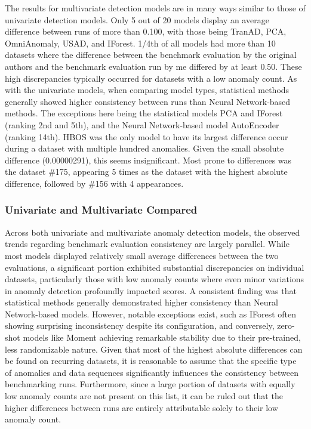 \documentclass[12pt,oneside]{article}
\begin{document}
The results for multivariate detection models are in many ways similar to those of univariate detection models. Only 5 out of 20 models display an average difference between runs of more than 0.100, with those being TranAD, PCA, OmniAnomaly, USAD, and IForest. 1/4th of all models had more than 10 datasets where the difference between the benchmark evaluation by the original authors and the benchmark evaluation run by me differed by at least 0.50. These high discrepancies typically occurred for datasets with a low anomaly count. As with the univariate models, when comparing model types, statistical methods generally showed higher consistency between runs than Neural Network-based methods. The exceptions here being the statistical models PCA and IForest (ranking 2nd and 5th), and the Neural Network-based model AutoEncoder (ranking 14th). HBOS was the only model to have its largest difference occur during a dataset with multiple hundred anomalies. Given the small absolute difference (0.00000291), this seems insignificant. Most prone to differences was the dataset \#175, appearing 5 times as the dataset with the highest absolute difference, followed by \#156 with 4 appearances.


\subsubsection{Univariate and Multivariate Compared}

Across both univariate and multivariate anomaly detection models, the observed trends regarding benchmark evaluation consistency are largely parallel. While most models displayed relatively small average differences between the two evaluations, a significant portion exhibited substantial discrepancies on individual datasets, particularly those with low anomaly counts where even minor variations in anomaly detection profoundly impacted scores. A consistent finding was that statistical methods generally demonstrated higher consistency than Neural Network-based models. However, notable exceptions exist, such as IForest often showing surprising inconsistency despite its configuration, and conversely, zero-shot models like Moment achieving remarkable stability due to their pre-trained, less randomizable nature. Given that most of the highest absolute differences can be found on recurring datasets, it is reasonable to assume that the specific type of anomalies and data sequences significantly influences the consistency between benchmarking runs. Furthermore, since a large portion of datasets with equally low anomaly counts are not present on this list, it can be ruled out that the higher differences between runs are entirely attributable solely to their low anomaly count. \par
\end{document}
